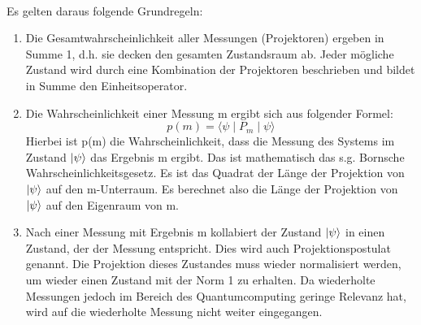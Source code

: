 \\ 
Es gelten daraus folgende Grundregeln: \\ 
\begin{enumerate}
\item Die Gesamtwahrscheinlichkeit aller Messungen (Projektoren) ergeben in Summe 1, d.h. sie decken den gesamten Zustandsraum ab. Jeder mögliche Zustand wird durch eine Kombination der Projektoren beschrieben und bildet in Summe den Einheitsoperator. \\
\item Die Wahrscheinlichkeit einer Messung m ergibt sich aus folgender Formel:
\begin{equation}
    p(m) = \langle \psi \mid P_m \mid \psi \rangle
\end{equation}
Hierbei ist p(m) die Wahrscheinlichkeit, dass die Messung des Systems im Zustand $\ket\psi$ das Ergebnis m ergibt. Das ist mathematisch das s.g. Bornsche Wahrscheinlichkeitsgesetz.
Es ist das Quadrat der Länge der Projektion von $\ket\psi$ auf den m-Unterraum. Es berechnet also die Länge der Projektion von $\ket\psi$ auf den Eigenraum von m. \\
\item Nach einer Messung mit Ergebnis m kollabiert der Zustand $\ket\psi$ in einen Zustand, der der Messung entspricht. Dies wird auch Projektionspostulat genannt. Die Projektion dieses Zustandes muss wieder normalisiert werden, um wieder einen Zustand mit der Norm 1 zu erhalten.
Da wiederholte Messungen jedoch im Bereich des Quantumcomputing geringe Relevanz hat, wird auf die wiederholte Messung nicht weiter eingegangen. \\ 
\end{enumerate}

